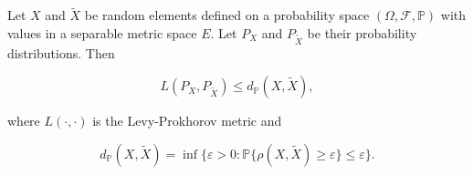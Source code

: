Let $X$ and $\tilde{X}$ be random elements defined on a probability space $(\Omega, \mathcal{F}, \mathbb{P})$ with values in a separable metric space $E$. Let $P_X$ and $P_{\tilde{X}}$ be their probability distributions. Then

$$L(P_X, P_{\tilde{X}}) \leq d_{\mathbb{P}}(X, \tilde{X}),$$

where $L(\cdot, \cdot)$ is the Levy-Prokhorov metric and

$$d_{\mathbb{P}}(X, \tilde{X}) = \inf\{\varepsilon > 0 : \mathbb{P}\{\rho(X, \tilde{X}) \geq \varepsilon\} \leq \varepsilon\}.$$
